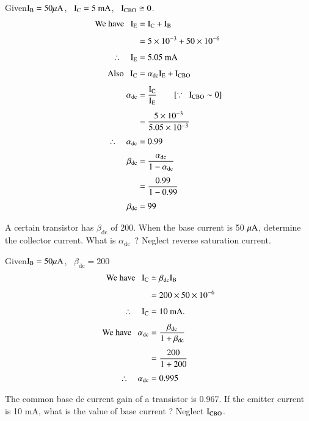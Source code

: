 \begin{solution}
Given\quad $\textrm{I}_{\textrm{B}}=50\mu\textrm{A}$, \ $\textrm{I}_{\textrm{C}}=5\text{~mA}$, \ $\textrm{I}_{\text{CBO}}\cong 0$.
\begin{align*}
\text{We have~~ } \textrm{I}_{\textrm{E}} &= \textrm{I}_{\textrm{C}}+\textrm{I}_{\textrm{B}}\\[4pt]
&= 5\times 10^{-3}+50\times 10^{-6}\\[4pt]
\therefore\quad \textrm{I}_{\textrm{E}} &= 5.05\text{~mA}\\[4pt]
\text{Also~~ } \textrm{I}_{\textrm{C}} &= \alpha_{\text{dc}}\textrm{I}_{\textrm{E}}+\textrm{I}_{\text{CBO}}\\[4pt]
\alpha_{\text{dc}} &= \frac{\textrm{I}_{\textrm{C}}}{\textrm{I}_{\textrm{E}}}\qquad [\because \ \ \textrm{I}_{\text{CBO}}\sim 0]\\[4pt]
&= \frac{5\times 10^{-3}}{5.05\times 10^{-3}}\\[4pt]
\therefore\quad \alpha_{\text{dc}} &= 0.99\\[4pt]
\beta_{\text{dc}} &= \frac{\alpha_{\text{dc}}}{1-\alpha_{\text{dc}}}\\[4pt]
&= \frac{0.99}{1-0.99}\\[4pt]
\beta_{\text{dc}} &= 99
\end{align*}
\end{solution}

\begin{problem}\label{prob2.6}
A certain transistor has $\beta_{\text{dc}}$ of 200. When the base current is 50 $\mu\textrm{A}$, determine the collector current. What is $\alpha_{\text{dc}}$~? Neglect reverse saturation current.
\end{problem}

\begin{solution}
Given\quad $\textrm{I}_{\textrm{B}}=50\mu\textrm{A}$, \ $\beta_{\text{dc}}=200$
\begin{align*}
\text{We have~~ } \textrm{I}_{\textrm{C}} &\simeq \beta_{\text{dc}}\textrm{I}_{\textrm{B}}\\[4pt]
&= 200\times 50\times 10^{-6}\\[4pt]
\therefore\quad \textrm{I}_{\textrm{C}} &= 10\text{~mA.}\\[4pt]
\text{We have~~ } \alpha_{\text{dc}} &= \frac{\beta_{\text{dc}}}{1+\beta_{\text{dc}}}\\[4pt]
&= \frac{200}{1+200}\\[4pt]
\therefore\quad \alpha_{\text{dc}} &= 0.995
\end{align*}
\end{solution}

\begin{problem}\label{prob2.7}
The common base dc current gain of a transistor is 0.967. If the emitter current is 10 mA, what is the value of base current ? Neglect $\textrm{I}_{\text{CBO}}$.
\end{problem}

